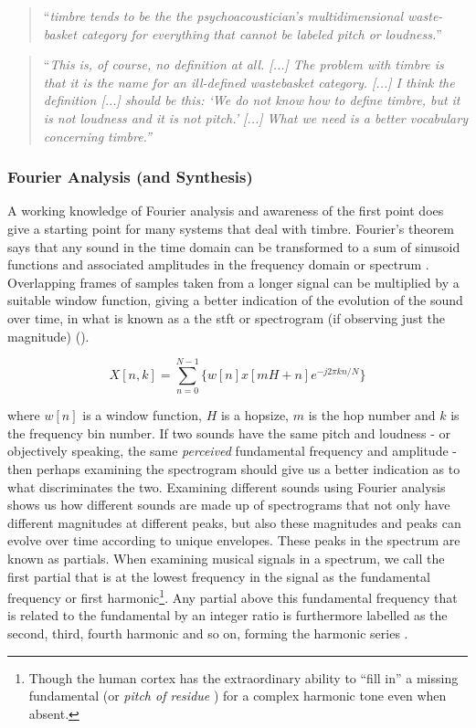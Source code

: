 {{\blockcquote[]{McAdams1979}{``\textit{timbre tends to be the the psychoacoustician's multidimensional waste-basket category for everything that cannot be labeled pitch or loudness.}''} 

\blockcquote[]{Bregman1994}{``\textit{This is, of course, no definition at all. [...] The problem with timbre is that it is the name for an ill-defined wastebasket category. [...] I think the definition [...] should be this: ‘We do not know how to define timbre, but it is not loudness and it is not pitch.’ [...] What we need is a better vocabulary concerning timbre.''}}

\subsubsection{Fourier Analysis (and Synthesis)}

A working knowledge of Fourier analysis and awareness of the first point \citep{ansi} does give a starting point for many systems that deal with timbre. Fourier's theorem says that any sound in the time domain can be transformed to a sum of sinusoid functions and associated amplitudes in the frequency domain or spectrum \citep{Roads1996}. Overlapping frames of samples taken from a longer signal can be multiplied by a suitable window function, giving a better indication of the evolution of the sound over time, in what is known as a the \acrshort{stft} or spectrogram (if observing just the magnitude) \citep{Collins2010}().

\begin{equation}
\label{eq:stft}
X[n,k] = \sum_{n=0}^{N-1}\{w[n]x[mH+n]e^{-j2\pi kn/N}\}
\end{equation}

where $w[n]$ is a window function, $H$ is a hopsize, $m$ is the hop number and $k$ is the frequency bin number. If two sounds have the same pitch and loudness - or objectively speaking, the same \textit{perceived} fundamental frequency and amplitude - then perhaps examining the spectrogram should give us a better indication as to what discriminates the two. Examining different sounds using Fourier analysis shows us how different sounds are made up of spectrograms that not only have different magnitudes at different peaks, but also these magnitudes and peaks can evolve over time according to unique envelopes. These peaks in the spectrum are known as partials. When examining musical signals in a spectrum, we call the first partial that is at the lowest frequency in the signal as the fundamental frequency or first harmonic\footnote{Though the human cortex has the extraordinary ability to ``fill in'' a missing fundamental (or \textit{pitch of residue} \citep{Weihs2009}) for a complex harmonic tone even when absent.}. Any partial above this fundamental frequency that is related to the fundamental by an integer ratio is furthermore labelled as the second, third, fourth harmonic and so on, forming the harmonic series \citep{Puckette2006}.

}}
